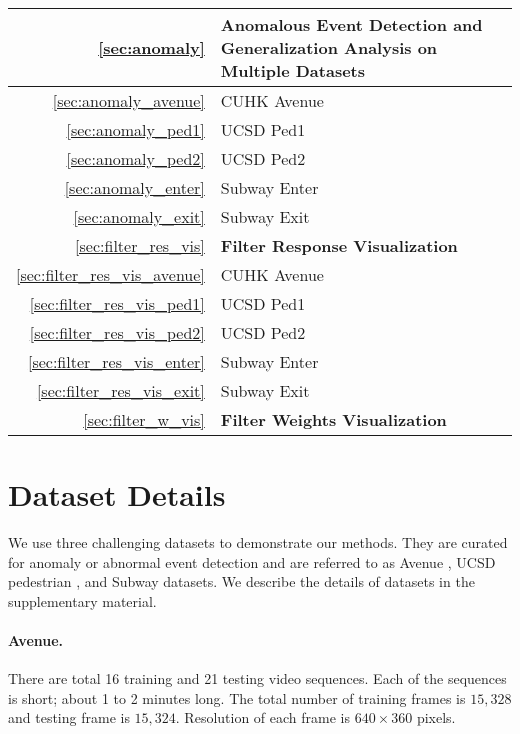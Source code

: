 \documentclass[10pt,twocolumn,letterpaper]{article}
\begin{document}
\begin{table*}[h]
\begin{tabular}{|r|p{12cm}|}
		\hline \hline
		\ref{sec:anomaly} & {\bf Anomalous Event Detection and Generalization Analysis on Multiple Datasets} \\
		\hline
		\ref{sec:anomaly_avenue} & CUHK Avenue\\
		\hline
		\ref{sec:anomaly_ped1} & UCSD Ped1 \\
		\hline
		\ref{sec:anomaly_ped2} & UCSD Ped2 \\
		\hline
		\ref{sec:anomaly_enter} & Subway Enter \\
		\hline
		\ref{sec:anomaly_exit} & Subway Exit \\
		\hline \hline
		\ref{sec:filter_res_vis} & {\bf Filter Response Visualization} \\
		\hline
		\ref{sec:filter_res_vis_avenue} & CUHK Avenue\\
		\hline
		\ref{sec:filter_res_vis_ped1} & UCSD Ped1 \\
		\hline
		\ref{sec:filter_res_vis_ped2} & UCSD Ped2 \\
		\hline
		\ref{sec:filter_res_vis_enter} & Subway Enter \\
		\hline
		\ref{sec:filter_res_vis_exit} & Subway Exit \\
		\hline \hline
		\ref{sec:filter_w_vis}  & {\bf Filter Weights Visualization} \\
		\hline
	\end{tabular}
\end{table*}

\clearpage



\section{Dataset Details}
\label{sec:datasets}

We use three challenging datasets to demonstrate our methods. 
They are curated for anomaly or abnormal event detection and are referred to as Avenue \cite{lu2013abnormal}, UCSD pedestrian \cite{mahadevan2010anomaly}, and Subway \cite{adam2008robust} datasets.
We describe the details of datasets in the supplementary material.

\paragraph{\bf Avenue.}
There are total 16 training and 21 testing video sequences. 
Each of the sequences is short; about 1 to 2 minutes long.
The total number of training frames is $15,328$ and testing frame is $15,324$. 
Resolution of each frame is $640\times360$ pixels. 
\end{document}
